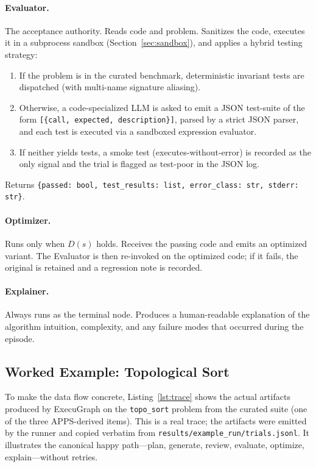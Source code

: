 \documentclass[journal]{IEEEtran}
\begin{document}
\paragraph{Evaluator.} The acceptance authority. Reads $\text{code}$ and $\text{problem}$. Sanitizes the code, executes it in a subprocess sandbox (Section~\ref{sec:sandbox}), and applies a hybrid testing strategy:
\begin{enumerate}
  \item If the problem is in the curated benchmark, deterministic invariant tests are dispatched (with multi-name signature aliasing).
  \item Otherwise, a code-specialized LLM is asked to emit a JSON test-suite of the form \texttt{[\{call, expected, description\}]}, parsed by a strict JSON parser, and each test is executed via a sandboxed expression evaluator.
  \item If neither yields tests, a smoke test (executes-without-error) is recorded as the only signal and the trial is flagged as test-poor in the JSON log.
\end{enumerate}
Returns \texttt{\{passed: bool, test\_results: list, error\_class: str, stderr: str\}}.

\paragraph{Optimizer.} Runs only when $D(s)$ holds. Receives the passing $\text{code}$ and emits an optimized variant. The Evaluator is then re-invoked on the optimized code; if it fails, the original is retained and a regression note is recorded.

\paragraph{Explainer.} Always runs as the terminal node. Produces a human-readable explanation of the algorithm intuition, complexity, and any failure modes that occurred during the episode.

\subsection{Worked Example: Topological Sort}\label{sec:worked}
To make the data flow concrete, Listing~\ref{lst:trace} shows the actual artifacts produced by ExecuGraph on the \texttt{topo\_sort} problem from the curated suite (one of the three APPS-derived items). This is a real trace; the artifacts were emitted by the runner and copied verbatim from \texttt{results/example\_run/trials.jsonl}. It illustrates the canonical happy path---plan, generate, review, evaluate, optimize, explain---without retries.
\end{document}
